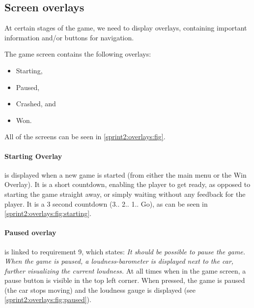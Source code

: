 \subsection{Screen overlays}
At certain stages of the game, we need to display overlays, containing important information and/or buttons for navigation.

The game screen contains the following overlays:

\begin{itemize}
\item Starting,
\item Paused,
\item Crashed, and
\item Won.
\end{itemize}

All of the screens can be seen in \cref{sprint2:overlays:fig}.

\paragraph{Starting Overlay} is displayed when a new game is started (from either the main menu or the Win Overlay).
It is a short countdown, enabling the player to get ready, as opposed to starting the game straight away, or simply waiting without any feedback for the player.
It is a 3 second countdown (3.. 2.. 1.. Go), as can be seen in \cref{sprint2:overlays:fig:starting}.

\paragraph{Paused overlay} is linked to requirement 9, which states: \textit{It should be possible to pause the game. When the game is paused, a loudness-barometer is displayed next to the car, further visualizing the current loudness.}
At all times when in the game screen, a pause button is visible in the top left corner.
When pressed, the game is paused (the car stops moving) and the loudness gauge is displayed (see \cref{sprint2:overlays:fig:paused}).